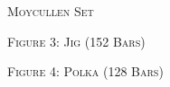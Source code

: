 \begin{center}
\textsc{Moycullen Set} \\
\end{center}

\small \textsc{Figure 3: Jig (152 Bars)}\\


\bodyText


\small \textsc{Figure 4: Polka (128 Bars)}\\
